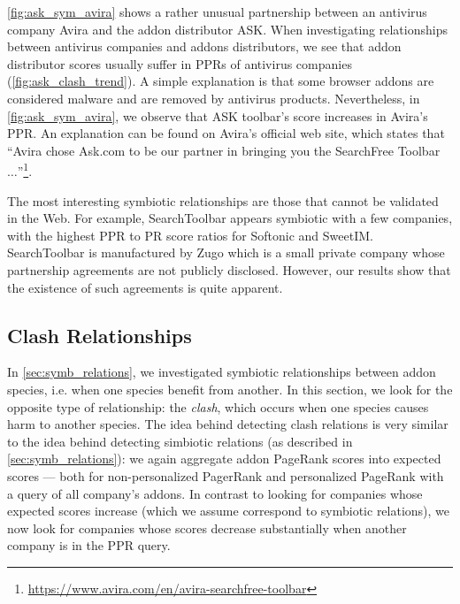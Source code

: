\documentclass[ijoc,nonblindrev]{informs3} %
\numberwithin{equation}{subsection}
\begin{document}
\autoref{fig:ask_sym_avira} shows a rather unusual partnership between an antivirus company Avira and the addon distributor ASK. When investigating relationships between antivirus companies and addons distributors, we see that addon distributor scores usually suffer in PPRs of antivirus companies  (\autoref{fig:ask_clash_trend}). A simple explanation is that some browser addons are considered malware and are removed by antivirus products. Nevertheless, in \autoref{fig:ask_sym_avira}, we observe that ASK toolbar's score increases in Avira's PPR. An explanation can be found on Avira's official web site, which states that ``Avira chose Ask.com to be our partner in bringing you the SearchFree Toolbar $\dots$''\footnote{\url{https://www.avira.com/en/avira-searchfree-toolbar}}. 

The most interesting symbiotic relationships are those that cannot be validated in the Web. For example, SearchToolbar appears symbiotic with a few companies, with the highest PPR to PR score ratios for Softonic and SweetIM. SearchToolbar is manufactured by Zugo which is a small private company whose partnership agreements are not publicly disclosed. However, our results show that the existence of such agreements is quite apparent.

\subsection{Clash Relationships}
\label{sec:clash_relations}

In \autoref{sec:symb_relations}, we investigated symbiotic relationships between addon species, i.e. when one species benefit from another. In this section, we look for the opposite type of relationship: the \emph{clash}, which occurs when one species causes harm to another species. The idea behind detecting clash relations is very similar to the idea behind detecting simbiotic relations (as described in \autoref{sec:symb_relations}): we again aggregate addon PageRank scores into expected scores --- both for non-personalized PagerRank and personalized PageRank with a query of all company's addons. In contrast to looking for companies whose expected scores increase (which we assume correspond to symbiotic relations), we now look for companies whose scores decrease substantially when another company is in the PPR query. 
\end{document}
